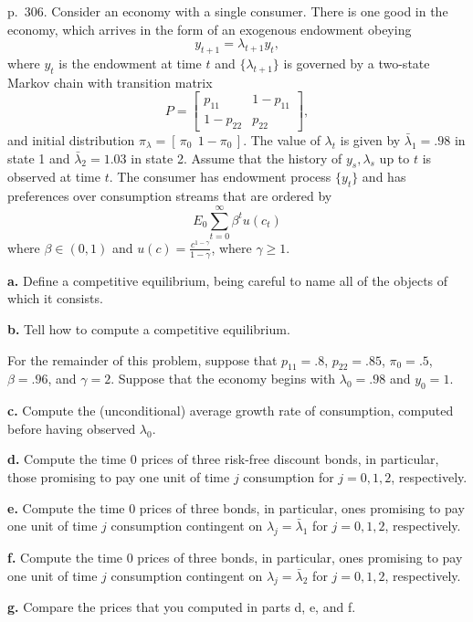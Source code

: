 \documentclass[12pt, letterpaper]{article}
\begin{document}
\begin{tcolorbox}[evenbox,title={Exercise 8.4 \quad Term structure of interest rates}]
\begin{tcolorbox}[questionbox]
p.~306. Consider an economy with a single consumer. There is one good in the economy, which arrives in
the form of an exogenous endowment obeying
\[
y_{t+1}=\lambda_{t+1}y_t,
\]
where $y_t$ is the endowment at time $t$ and $\{\lambda_{t+1}\}$ is governed by a two-state Markov chain with
transition matrix
\[
P=\begin{bmatrix}p_{11}&1-p_{11}\\1-p_{22}&p_{22}\end{bmatrix},
\]
and initial distribution $\pi_\lambda=[\,\pi_0\ \ 1-\pi_0\,]$. The value of $\lambda_t$ is given by
$\bar\lambda_1=.98$ in state 1 and $\bar\lambda_2=1.03$ in state 2. Assume that the history of $y_s,\lambda_s$ up to
$t$ is observed at time $t$. The consumer has endowment process $\{y_t\}$ and has preferences over
consumption streams that are ordered by
\[
E_0\sum_{t=0}^\infty\beta^tu(c_t)
\]
where $\beta\in(0,1)$ and $u(c)=\frac{c^{1-\gamma}}{1-\gamma}$, where $\gamma\ge1$.

\textbf{a.} Define a competitive equilibrium, being careful to name all of the objects of which it consists.

\textbf{b.} Tell how to compute a competitive equilibrium.

For the remainder of this problem, suppose that $p_{11}=.8$, $p_{22}=.85$, $\pi_0=.5$, $\beta=.96$, and
$\gamma=2$. Suppose that the economy begins with $\lambda_0=.98$ and $y_0=1$.

\textbf{c.} Compute the (unconditional) average growth rate of consumption, computed before having
observed $\lambda_0$.

\textbf{d.} Compute the time 0 prices of three risk-free discount bonds, in particular, those promising to pay
one unit of time $j$ consumption for $j=0,1,2$, respectively.

\textbf{e.} Compute the time 0 prices of three bonds, in particular, ones promising to pay one unit of time
$j$ consumption contingent on $\lambda_j=\bar\lambda_1$ for $j=0,1,2$, respectively.

\textbf{f.} Compute the time 0 prices of three bonds, in particular, ones promising to pay one unit of time
$j$ consumption contingent on $\lambda_j=\bar\lambda_2$ for $j=0,1,2$, respectively.

\textbf{g.} Compare the prices that you computed in parts d, e, and f.
\end{tcolorbox}


\end{tcolorbox}
\end{document}
